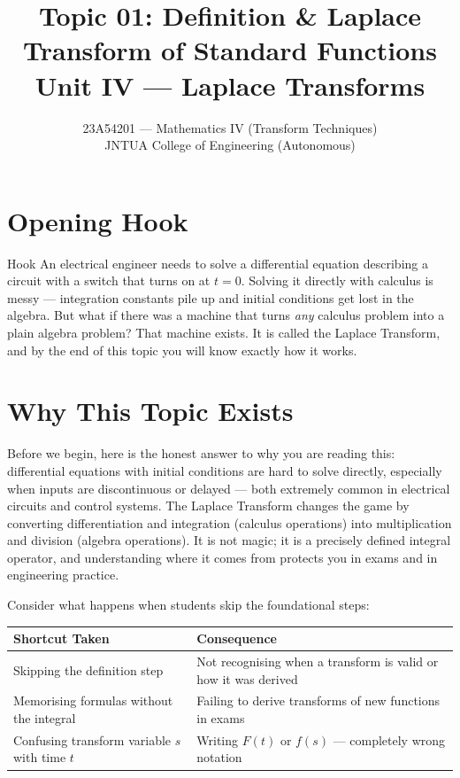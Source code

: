 \documentclass[12pt,a4paper]{article}
\title{Topic 01: Definition \& Laplace Transform of Standard Functions \\
       \large Unit IV --- Laplace Transforms}
\author{23A54201 --- Mathematics IV (Transform Techniques) \\
        JNTUA College of Engineering (Autonomous)}
\date{}
\begin{document}
\maketitle
\tableofcontents
\newpage

\section{Opening Hook}

\begin{curiositybox}{Hook}
An electrical engineer needs to solve a differential equation describing a circuit with a switch that turns on at $t=0$. Solving it directly with calculus is messy --- integration constants pile up and initial conditions get lost in the algebra. But what if there was a machine that turns \emph{any} calculus problem into a plain algebra problem? That machine exists. It is called the Laplace Transform, and by the end of this topic you will know exactly how it works.
\end{curiositybox}

\section{Why This Topic Exists}

Before we begin, here is the honest answer to why you are reading this: differential equations with initial conditions are hard to solve directly, especially when inputs are discontinuous or delayed --- both extremely common in electrical circuits and control systems. The Laplace Transform changes the game by converting differentiation and integration (calculus operations) into multiplication and division (algebra operations). It is not magic; it is a precisely defined integral operator, and understanding where it comes from protects you in exams and in engineering practice.

\medskip

\noindent Consider what happens when students skip the foundational steps:

\begin{center}
\begin{tabular}{@{}ll@{}}
\toprule
\textbf{Shortcut Taken} & \textbf{Consequence} \\
\midrule
Skipping the definition step & Not recognising when a transform is valid or how it was derived \\
Memorising formulas without the integral & Failing to derive transforms of new functions in exams \\
Confusing transform variable $s$ with time $t$ & Writing $F(t)$ or $f(s)$ --- completely wrong notation \\
\bottomrule
\end{tabular}
\end{center}
\end{document}
